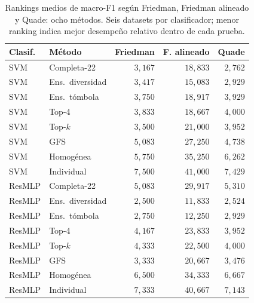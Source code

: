 \begin{table}[H]
\centering\fontsize{8}{10}\selectfont\setlength{\tabcolsep}{3.0pt}
\caption{Rankings medios de macro-F1 según Friedman, Friedman alineado y Quade: ocho métodos. Seis datasets por clasificador; menor ranking indica mejor desempeño relativo dentro de cada prueba.}
\label{tab:sel-metodos-rankings}
\begin{tabular}{@{}llrrr@{}}
\toprule
Clasif. & Método & Friedman & F. alineado & Quade \\
\midrule
SVM & Completa-22 & $3{,}167$ & $18{,}833$ & $2{,}762$ \\
SVM & Ens.\ diversidad & $3{,}417$ & $15{,}083$ & $2{,}929$ \\
SVM & Ens.\ tómbola & $3{,}750$ & $18{,}917$ & $3{,}929$ \\
SVM & Top-4 & $3{,}833$ & $18{,}667$ & $4{,}000$ \\
SVM & Top-$k$ & $3{,}500$ & $21{,}000$ & $3{,}952$ \\
SVM & GFS & $5{,}083$ & $27{,}250$ & $4{,}738$ \\
SVM & Homogénea & $5{,}750$ & $35{,}250$ & $6{,}262$ \\
SVM & Individual & $7{,}500$ & $41{,}000$ & $7{,}429$ \\
ResMLP & Completa-22 & $5{,}083$ & $29{,}917$ & $5{,}310$ \\
ResMLP & Ens.\ diversidad & $2{,}500$ & $11{,}833$ & $2{,}524$ \\
ResMLP & Ens.\ tómbola & $2{,}750$ & $12{,}250$ & $2{,}929$ \\
ResMLP & Top-4 & $4{,}167$ & $23{,}833$ & $3{,}952$ \\
ResMLP & Top-$k$ & $4{,}333$ & $22{,}500$ & $4{,}000$ \\
ResMLP & GFS & $3{,}333$ & $20{,}667$ & $3{,}476$ \\
ResMLP & Homogénea & $6{,}500$ & $34{,}333$ & $6{,}667$ \\
ResMLP & Individual & $7{,}333$ & $40{,}667$ & $7{,}143$ \\
\bottomrule
\end{tabular}
\end{table}
